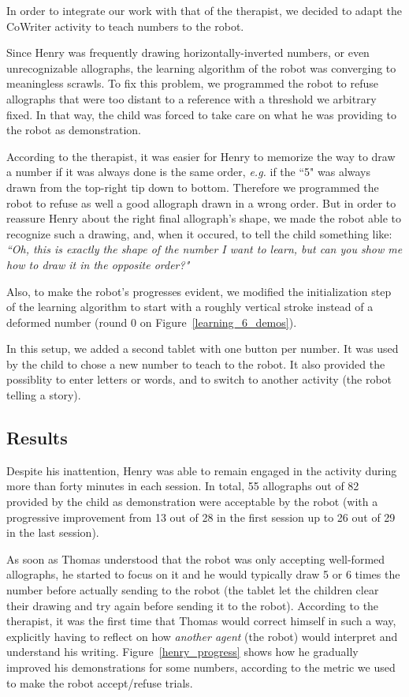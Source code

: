 \documentclass{sig-alternate}
\begin{document}
In order to integrate our work with that of the therapist, we decided to adapt the 
CoWriter activity to teach numbers to the robot.

Since Henry was frequently drawing horizontally-inverted numbers, or even
unrecognizable allographs, the learning algorithm of the robot was converging to
meaningless scrawls. To fix this problem, we programmed the robot to refuse allographs that
were too distant to a reference with a threshold we arbitrary fixed. In that way,
the child was forced to take care on what he was providing to the robot as
demonstration. 

According to the therapist, it was easier for Henry to memorize the way to draw
a number if it was always done is the same order, \emph{e.g.} if the ``5" was always
drawn from the top-right tip down to bottom. Therefore we programmed the robot to
refuse as well a good allograph drawn in a wrong order. But in order to reassure Henry
about the right final allograph's shape, we made the robot able to recognize
such a drawing, and, when it occured, to tell the child something like:
\emph{``Oh, this is exactly the shape of the number I want to learn, but can you
show me how to draw it in the opposite order?"}

Also, to make
the robot's progresses evident, we modified the initialization step of the
learning algorithm to start with a roughly vertical stroke instead of a
deformed number (round 0 on Figure~\ref{learning_6_demos}).

In this setup, we added a second tablet with one button per number. It was used
by the child to chose a new number to teach to the robot. It also provided the
possiblity to enter letters or words, and to switch to another activity (the
robot telling a story).


\subsection{Results}
Despite his inattention, Henry was able to remain engaged in the activity during more than
forty minutes in each session. In total, 55 allographs out of 82 
provided by the child as demonstration were acceptable by the robot (with a
progressive improvement from 13 out of 28 in the first session up to 26 out
of 29 in the last session).

As soon as Thomas understood that the robot was only accepting well-formed
allographs, he started to focus on it and he would typically draw 5 or 6 times
the number before actually sending to the robot (the tablet let the children
clear their drawing and try again before sending it to the robot). According to
the therapist, it was the first time that Thomas would correct himself in such a
way, explicitly having to reflect on how \emph{another agent} (the robot) would
interpret and understand his writing. Figure~\ref{henry_progress} shows how
he gradually improved his demonstrations for some numbers, according to the
metric we used to make the robot accept/refuse trials.
\end{document}
